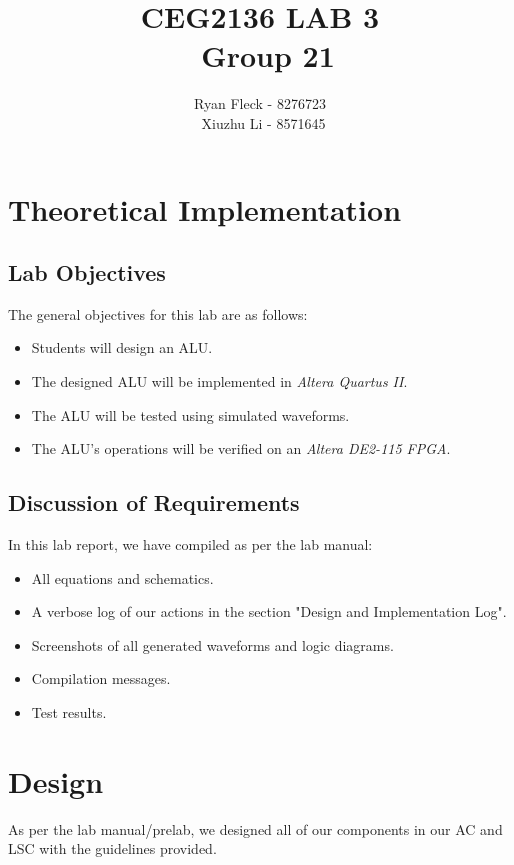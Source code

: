 \documentclass[a4paper,12pt]{article}
\begin{document}
\title{CEG2136 LAB 3 \\\ Group 21}
\author{Ryan Fleck - 8276723 \\\ Xiuzhu Li - 8571645}
\maketitle
\newpage
{}
\tableofcontents
\listoffigures
\newpage
{}  


\section{Theoretical Implementation}

\subsection{Lab Objectives}

The general objectives for this lab are as follows:
\begin{itemize}
\item Students will design an ALU.
\item The designed ALU will be implemented in \textit{Altera Quartus II}.
\item The ALU will be tested using simulated waveforms.
\item The ALU's operations will be verified on an \textit{Altera DE2-115 FPGA}.
\end{itemize}

\subsection{Discussion of Requirements}
In this lab report, we have compiled as per the lab manual:
\begin{itemize}
\item All equations and schematics.
\item A verbose log of our actions in the section "Design and Implementation Log".
\item Screenshots of all generated waveforms and logic diagrams.
\item Compilation messages.
\item Test results.
\end{itemize}

\section{Design}
As per the lab manual/prelab, we designed all of our components in our AC and LSC with the guidelines provided. 
\end{document}
